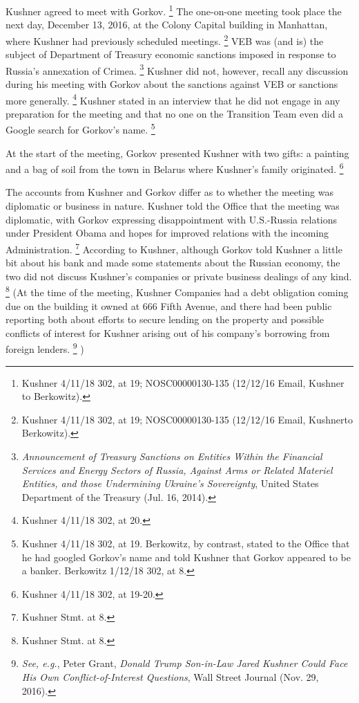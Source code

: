 Kushner agreed to meet with Gorkov.%
\footnote{Kushner 4/11/18 302, at 19;
NOSC00000130-135 (12/12/16 Email, Kushner to Berkowitz).}
The one-on-one meeting took place the next day, December 13, 2016, at the Colony Capital building in Manhattan, where Kushner had previously scheduled meetings.%
\footnote{Kushner 4/11/18 302, at 19;
NOSC00000130-135 (12/12/16 Email, Kushnerto Berkowitz).}
VEB was (and is) the subject of Department of Treasury economic sanctions imposed in response to Russia's annexation of Crimea.%
\footnote{\textit{Announcement of Treasury Sanctions on Entities Within the Financial Services and Energy Sectors of Russia, Against Arms or Related Materiel Entities, and those Undermining Ukraine's Sovereignty}, United States Department of the Treasury (Jul. 16, 2014).}
Kushner did not, however, recall any discussion during his meeting with Gorkov about the sanctions against VEB or sanctions more generally.%
\footnote{Kushner 4/11/18 302, at 20.}
Kushner stated in an interview that he did not engage in any preparation for the meeting and that no one on the Transition Team even did a Google search for Gorkov's name.%
\footnote{Kushner 4/11/18 302, at 19.
Berkowitz, by contrast, stated to the Office that he had googled Gorkov’s name and told Kushner that Gorkov appeared to be a banker.
Berkowitz 1/12/18 302, at 8.}

At the start of the meeting, Gorkov presented Kushner with two gifts: a painting and a bag of soil from the town in Belarus where Kushner's family originated.%
\footnote{Kushner 4/11/18 302, at 19-20.}

The accounts from Kushner and Gorkov differ as to whether the meeting was diplomatic or business in nature.
Kushner told the Office that the meeting was diplomatic, with Gorkov expressing disappointment with U.S.-Russia relations under President Obama and hopes for improved relations with the incoming Administration.%
\footnote{Kushner Stmt. at 8.}
According to Kushner, although Gorkov told Kushner a little bit about his bank and made some statements about the Russian economy, the two did not discuss Kushner's companies or private business dealings of any kind.%
\footnote{Kushner Stmt. at 8.}
(At the time of the meeting, Kushner Companies had a debt obligation coming due on the building it owned at 666 Fifth Avenue, and there had been public reporting both about efforts to secure lending on the property and possible conflicts of interest for Kushner arising out of his company's borrowing from foreign lenders.%
\footnote{\textit{See, e.g.}, Peter Grant, \textit{Donald Trump Son-in-Law Jared Kushner Could Face His Own Conflict-of-Interest Questions}, Wall Street Journal (Nov. 29, 2016).}
)


